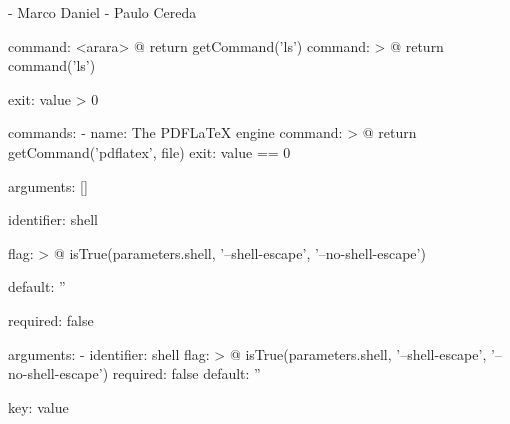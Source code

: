 - Marco Daniel
- Paulo Cereda

command: <arara> @{ return getCommand('ls') }
command: >
	@{
		return command('ls')
	}

exit: value > 0

commands:
- name: The PDFLaTeX engine
	command: >
		@{
			return getCommand('pdflatex', file)
		}
	exit: value == 0

arguments: []

identifier: shell

flag: >
	@{
			isTrue(parameters.shell, '--shell-escape',
						 '--no-shell-escape')
	}

default: ''

required: false

arguments:
- identifier: shell
	flag: >
		@{
				isTrue(parameters.shell,
							'--shell-escape',
							'--no-shell-escape')
		}
required: false
default: ''

key: value
